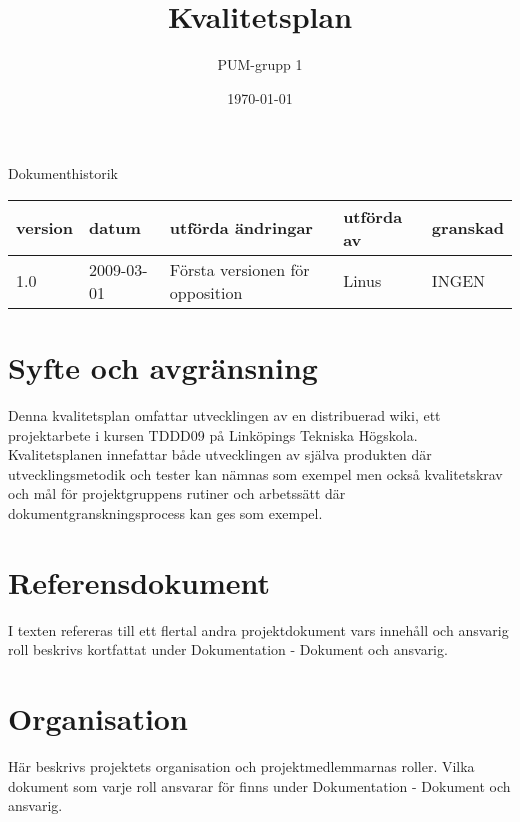 

\ifpdf
\else
\fi

\title{Kvalitetsplan}
\author{PUM-grupp 1}
\date{\today}



\maketitle\thispagestyle{empty}
\newpage

{\centering \Large{Dokumenthistorik\\}}

\vspace{10pt}
\begin{tabularx}{\textwidth}{ |l|l|X|l|l| }
  \hline
    \textbf{version} & \textbf{datum} & \textbf{utförda ändringar} & \textbf{utförda av} & \textbf{granskad} \\
	\hline 
  1.0 & 2009-03-01 &  Första versionen för opposition  & Linus & INGEN \\
  \hline
\end{tabularx}

\newpage

\setcounter{tocdepth}{2}
\tableofcontents
\newpage

\section{Syfte och avgränsning}
Denna kvalitetsplan omfattar utvecklingen av en distribuerad wiki, ett projektarbete i kursen TDDD09 på Linköpings Tekniska Högskola. Kvalitetsplanen innefattar både utvecklingen av själva produkten där utvecklingsmetodik och tester kan nämnas som exempel men också kvalitetskrav och mål för projektgruppens rutiner och arbetssätt där dokumentgranskningsprocess kan ges som exempel. 

\section{Referensdokument}
I texten refereras till ett flertal andra projektdokument vars innehåll och ansvarig roll beskrivs kortfattat under Dokumentation - Dokument och ansvarig. 

\section{Organisation}
Här beskrivs projektets organisation och projektmedlemmarnas roller. Vilka dokument som varje roll ansvarar för finns under Dokumentation - Dokument och ansvarig.

